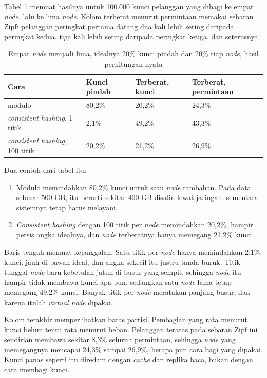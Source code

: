 Tabel \ref{tab:partisi14} memuat hasilnya untuk 100.000 kunci pelanggan yang
dibagi ke empat \textit{node}, lalu ke lima \textit{node}. Kolom terberat menurut permintaan
memakai sebaran Zipf: pelanggan peringkat pertama datang dua kali lebih sering
daripada peringkat kedua, tiga kali lebih sering daripada peringkat ketiga,
dan seterusnya.

\begin{table}[!htb]
  \centering
  \caption{Empat \textit{node} menjadi lima, idealnya 20\% kunci pindah dan 20\% tiap
           \textit{node}, hasil perhitungan nyata}
  \label{tab:partisi14}
  \begin{tabularx}{\textwidth}{Xlll}
    \hline
    \textbf{Cara} & \textbf{Kunci pindah} & \textbf{Terberat, kunci} & \textbf{Terberat, permintaan} \\
    \hline
    modulo & 80,2\% & 20,2\% & 24,3\% \\
    \hline
    \textit{consistent hashing}, 1 titik & 2,1\% & 49,2\% & 43,3\% \\
    \hline
    \textit{consistent hashing}, 100 titik & 20,2\% & 21,2\% & 26,9\% \\
    \hline
  \end{tabularx}
\end{table}

Dua contoh dari tabel itu:
\begin{enumerate}
  \item Modulo memindahkan 80,2\% kunci untuk satu \textit{node} tambahan. Pada data
        sebesar 500 GB, itu berarti sekitar 400 GB disalin lewat jaringan,
        sementara sistemnya tetap harus melayani.
  \item \textit{Consistent hashing} dengan 100 titik per \textit{node} memindahkan
        20,2\%, hampir persis angka idealnya, dan \textit{node} terberatnya hanya
        memegang 21,2\% kunci.
\end{enumerate}

Baris tengah memuat kejanggalan. Satu titik per \textit{node} hanya memindahkan 2,1\%
kunci, jauh di bawah ideal, dan angka sekecil itu justru tanda buruk. Titik
tunggal \textit{node} baru kebetulan jatuh di busur yang sempit, sehingga \textit{node} itu
hampir tidak membawa kunci apa pun, sedangkan satu \textit{node} lama tetap memegang
49,2\% kunci. Banyak titik per \textit{node} meratakan panjang busur, dan karena
itulah \textit{virtual node} dipakai.

Kolom terakhir memperlihatkan batas partisi. Pembagian yang rata menurut
kunci belum tentu rata menurut beban. Pelanggan teratas pada sebaran Zipf ini
sendirian membawa sekitar 8,3\% seluruh permintaan, sehingga \textit{node} yang
memegangnya mencapai 24,3\% sampai 26,9\%, berapa pun cara bagi yang dipakai.
Kunci panas seperti itu diredam dengan \textit{cache} dan replika baca, bukan
dengan cara membagi kunci.

